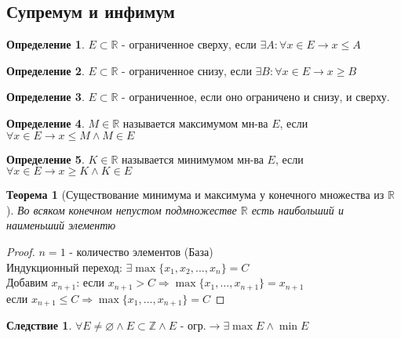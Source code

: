 \documentclass[12pt]{article}
\newtheorem{theorem}{Теорема}
\theoremstyle{definition}
\newtheorem{definition}{Определение}
\newtheorem{consequence}{Следствие}
\begin{document}
    \subsection{Супремум и инфимум}


    \begin{definition}
        $E \subset \mathbb{R}$ - ограниченное сверху, если $\exists A : \forall x \in E \to x \leqslant A$ 
    \end{definition}
    
    \begin{definition}
        $E \subset \mathbb{R}$ - ограниченное снизу, если $\exists B : \forall x \in E \to x \geqslant B$  
    \end{definition}

    \begin{definition}
        $E \subset \mathbb{R}$ - ограниченное, если оно ограничено и снизу, и сверху.
    \end{definition}

    \begin{definition}
        $M \in \mathbb{R}$ называется максимумом мн-ва $E$, если $\forall x \in E \to x \leqslant M \wedge M \in E$ 
    \end{definition}    

    \begin{definition}
        $K \in \mathbb{R}$ называется минимумом мн-ва $E$, если $\forall x \in E \to x \geqslant K \wedge K \in E$ 
    \end{definition}

    \begin{theorem}[Существование минимума и максимума у конечного множества из $\mathbb{R}$ ]
        Во всяком конечном непустом подмножестве $\mathbb{R}$ есть наибольший и наименьший элементю
    \end{theorem}

    \begin{proof}
        $n = 1$ - количество элементов (База) \\
        Индукционный переход: $\exists \max\{x_1, x_2, ..., x_n\} = C$ \\
        Добавим $x_{n + 1}$: если $x_{n + 1} > C \Rightarrow \max\{x_1, ..., x_{n + 1}\} = x_{n + 1}$ \\
        если $x_{n + 1} \leqslant C \Rightarrow \max\{x_1, ..., x_{n + 1}\} = C$     
    \end{proof}

    \begin{consequence}
        $\forall E \neq \varnothing \wedge E \subset \mathbb{Z}\wedge E \text{ - огр.} \to \exists \max E \wedge \min E $ 
    \end{consequence}
\end{document}
